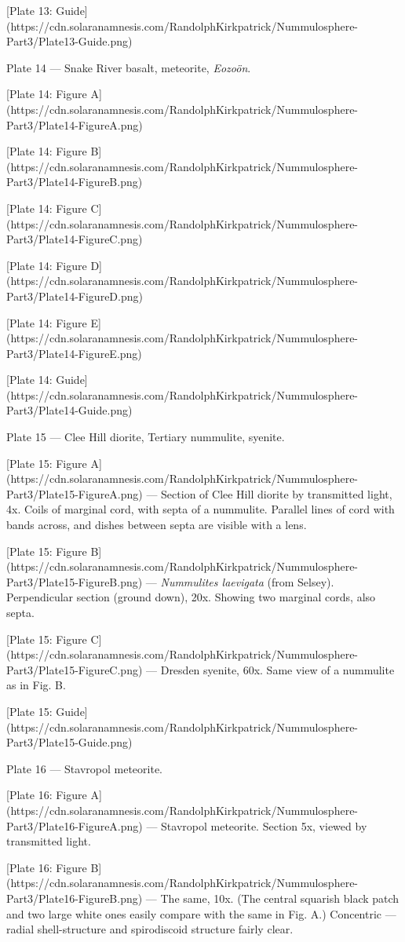 \documentclass[a4paper, 12pt, oneside]{article}
\begin{document}
[Plate 13: Guide](https://cdn.solaranamnesis.com/RandolphKirkpatrick/Nummulosphere-Part3/Plate13-Guide.png)

Plate 14 --- Snake River basalt, meteorite, \emph{Eozoön}.

[Plate 14: Figure A](https://cdn.solaranamnesis.com/RandolphKirkpatrick/Nummulosphere-Part3/Plate14-FigureA.png)

[Plate 14: Figure B](https://cdn.solaranamnesis.com/RandolphKirkpatrick/Nummulosphere-Part3/Plate14-FigureB.png)

[Plate 14: Figure C](https://cdn.solaranamnesis.com/RandolphKirkpatrick/Nummulosphere-Part3/Plate14-FigureC.png)

[Plate 14: Figure D](https://cdn.solaranamnesis.com/RandolphKirkpatrick/Nummulosphere-Part3/Plate14-FigureD.png)

[Plate 14: Figure E](https://cdn.solaranamnesis.com/RandolphKirkpatrick/Nummulosphere-Part3/Plate14-FigureE.png)

[Plate 14: Guide](https://cdn.solaranamnesis.com/RandolphKirkpatrick/Nummulosphere-Part3/Plate14-Guide.png)

Plate 15 --- Clee Hill diorite, Tertiary nummulite, syenite.

[Plate 15: Figure A](https://cdn.solaranamnesis.com/RandolphKirkpatrick/Nummulosphere-Part3/Plate15-FigureA.png) --- Section of Clee Hill diorite by transmitted light, 4x. Coils of marginal cord, with septa of a nummulite. Parallel lines of cord with bands across, and dishes between septa are visible with a lens.

[Plate 15: Figure B](https://cdn.solaranamnesis.com/RandolphKirkpatrick/Nummulosphere-Part3/Plate15-FigureB.png) --- \emph{Nummulites laevigata} (from Selsey). Perpendicular section (ground down), 20x. Showing two marginal cords, also septa.

[Plate 15: Figure C](https://cdn.solaranamnesis.com/RandolphKirkpatrick/Nummulosphere-Part3/Plate15-FigureC.png) --- Dresden syenite, 60x. Same view of a nummulite as in Fig. B.

[Plate 15: Guide](https://cdn.solaranamnesis.com/RandolphKirkpatrick/Nummulosphere-Part3/Plate15-Guide.png)

Plate 16 --- Stavropol meteorite.

[Plate 16: Figure A](https://cdn.solaranamnesis.com/RandolphKirkpatrick/Nummulosphere-Part3/Plate16-FigureA.png) --- Stavropol meteorite. Section 5x, viewed by transmitted light.

[Plate 16: Figure B](https://cdn.solaranamnesis.com/RandolphKirkpatrick/Nummulosphere-Part3/Plate16-FigureB.png) --- The same, 10x. (The central squarish black patch and two large white ones easily compare with the same in Fig. A.) Concentric --- radial shell-structure and spirodiscoid structure fairly clear.
\end{document}
